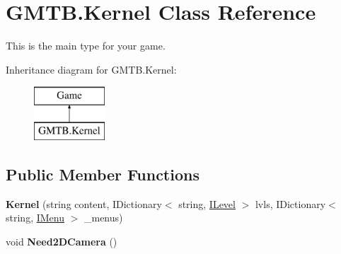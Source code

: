 \hypertarget{class_g_m_t_b_1_1_kernel}{}\section{G\+M\+T\+B.\+Kernel Class Reference}
\label{class_g_m_t_b_1_1_kernel}


This is the main type for your game.  


Inheritance diagram for G\+M\+T\+B.\+Kernel\+:\begin{figure}[H]
\begin{center}
\leavevmode
\includegraphics[height=2.000000cm]{class_g_m_t_b_1_1_kernel}
\end{center}
\end{figure}
\subsection*{Public Member Functions}
\begin{DoxyCompactItemize}
\item 
\mbox{\label{class_g_m_t_b_1_1_kernel_a717fe530d7f48929a4890cca6a61856a}} 
{\bfseries Kernel} (string content, I\+Dictionary$<$ string, \mbox{\hyperlink{interface_g_m_t_b_1_1_interfaces_1_1_i_level}{I\+Level}} $>$ lvls, I\+Dictionary$<$ string, \mbox{\hyperlink{interface_g_m_t_b_1_1_interfaces_1_1_i_menu}{I\+Menu}} $>$ \+\_\+menus)
\item 
\mbox{\label{class_g_m_t_b_1_1_kernel_a4b1bbece6fc06f239a1890bd89a5f5f8}} 
void {\bfseries Need2\+D\+Camera} ()
\end{DoxyCompactItemize}
